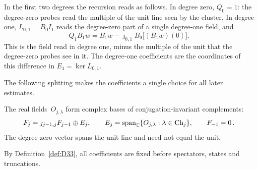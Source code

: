 In the first two degrees the recursion reads as follows. In degree zero, $Q_0=1$: the degree-zero probes read the multiple of the unit line seen by the cluster. In degree one, $L_{0,1}=B_0I_1$ reads the degree-zero part of a single degree-one field, and
\begin{equation*}
Q_1B_1w=B_1w-\jmath_{0,1}B_0\bigl[(B_1w)(0)\bigr].
\end{equation*}
This is the field read in degree one, minus the multiple of the unit that the degree-zero probes see in it. The degree-one coefficients are the coordinates of this difference in $E_1=\ker L_{0,1}$.

The following splitting makes the coefficients a single choice for all later estimates.

\begin{lemma}\label{lem:J1.1}
The real fields~$O_{j,\lambda}$ form complex bases of conjugation-invariant complements:
\begin{equation*}
F_j=\jmath_{j-1,j}F_{j-1}\oplus E_j,\qquad
E_j=\operatorname{span}_{\mathbb{C}}\{O_{j,\lambda}:\lambda\in\mathrm{Ch}_{j}\},\qquad F_{-1}=0\,.
\end{equation*}
The degree-zero vector spans the unit line and need not equal the unit.
\end{lemma}
By Definition~\ref{def:D33}, all coefficients are fixed before spectators, states and truncations.

